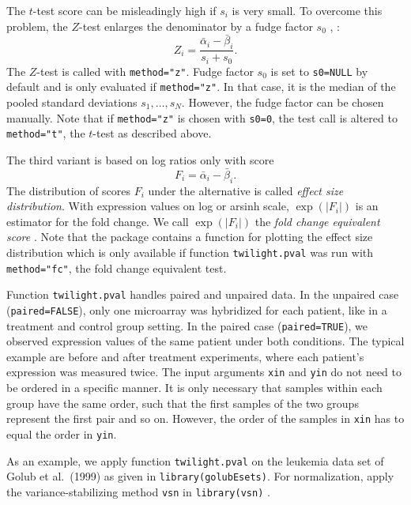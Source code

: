 \documentclass[11pt,a4paper,fleqn]{report}
\newcommand{\Rfunction}[1]{{\texttt{#1}}}
\newcommand{\Rfunarg}[1]{{\texttt{#1}}}
\begin{document}
The $t$-test score can be misleadingly high if $s_i$ is very small. To overcome this problem, the $Z$-test enlarges the denominator by a fudge factor $s_0$ \cite{tusher01}, \cite{efron01}:
\begin{equation}
  Z_i=\frac{\bar \alpha_i - \bar \beta_i}{s_i + s_0}.
\end{equation}
The $Z$-test is called with \Rfunarg{method="z"}. Fudge factor $s_0$ is set to \Rfunarg{s0=NULL} by default and is only evaluated if \Rfunarg{method="z"}. In that case, it is the median of the pooled standard deviations $s_1,\dots,s_N$. However, the fudge factor can be chosen manually. Note that if \Rfunarg{method="z"} is chosen with \Rfunarg{s0=0}, the test call is altered to \Rfunarg{method="t"}, the $t$-test as described above.

The third variant is based on log ratios only with score
\begin{equation}
  F_i=\bar \alpha_i - \bar \beta_i.
\end{equation}
The distribution of scores $F_i$ under the alternative is called \textit{effect size distribution}. With expression values on log or arsinh scale, $\exp (|F_i|)$ is an estimator for the fold change. We call $\exp (|F_i|)$ the \textit{fold change equivalent score} \cite{scheid04}. Note that the package contains a function for plotting the effect size distribution which is only available if function \Rfunction{twilight.pval} was run with \Rfunarg{method="fc"}, the fold change equivalent test.

Function \Rfunction{twilight.pval} handles paired and unpaired data. In the unpaired case (\Rfunarg{paired=FALSE}), only one microarray was hybridized for each patient, like in a treatment and control group setting. In the paired case (\Rfunarg{paired=TRUE}), we observed expression values of the same patient under both conditions. The typical example are before and after treatment experiments, where each patient's expression was measured twice. %
       The input arguments \Rfunarg{xin} and \Rfunarg{yin} do not need to be ordered in a specific manner. It is only necessary that samples within each group have the same order, such that the first samples of the two groups represent the first pair and so on. However, the order of the samples in \Rfunarg{xin} has to equal the order in \Rfunarg{yin}.
       
As an example, we apply function \Rfunction{twilight.pval} on the leukemia data set of Golub et al.~(1999) \cite{golub99} as given in \Rfunction{library(golubEsets)}. For normalization, apply the variance-stabilizing method \Rfunction{vsn} in \Rfunction{library(vsn)} \cite{huber02}.
\begin{Schunk}
\end{Schunk}
\end{document}
